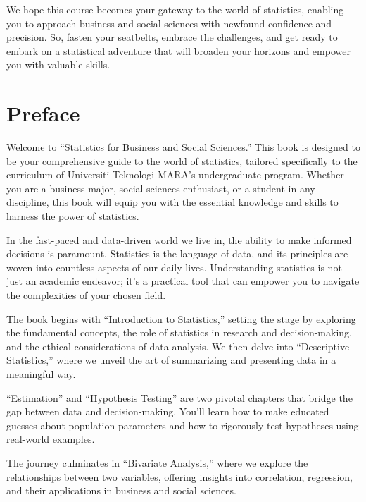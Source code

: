 \documentclass[
  a4paper,
  DIV=11,
  numbers=noendperiod,
  oneside]{scrreprt}
\begin{document}
We hope this course becomes your gateway to the world of statistics,
enabling you to approach business and social sciences with newfound
confidence and precision. So, fasten your seatbelts, embrace the
challenges, and get ready to embark on a statistical adventure that will
broaden your horizons and empower you with valuable skills.


\hypertarget{preface}{%
\chapter*{Preface}\label{preface}}


Welcome to ``Statistics for Business and Social Sciences.'' This book is
designed to be your comprehensive guide to the world of statistics,
tailored specifically to the curriculum of Universiti Teknologi MARA's
undergraduate program. Whether you are a business major, social sciences
enthusiast, or a student in any discipline, this book will equip you
with the essential knowledge and skills to harness the power of
statistics.

In the fast-paced and data-driven world we live in, the ability to make
informed decisions is paramount. Statistics is the language of data, and
its principles are woven into countless aspects of our daily lives.
Understanding statistics is not just an academic endeavor; it's a
practical tool that can empower you to navigate the complexities of your
chosen field.

The book begins with ``Introduction to Statistics,'' setting the stage
by exploring the fundamental concepts, the role of statistics in
research and decision-making, and the ethical considerations of data
analysis. We then delve into ``Descriptive Statistics,'' where we unveil
the art of summarizing and presenting data in a meaningful way.

``Estimation'' and ``Hypothesis Testing'' are two pivotal chapters that
bridge the gap between data and decision-making. You'll learn how to
make educated guesses about population parameters and how to rigorously
test hypotheses using real-world examples.

The journey culminates in ``Bivariate Analysis,'' where we explore the
relationships between two variables, offering insights into correlation,
regression, and their applications in business and social sciences.
\end{document}
